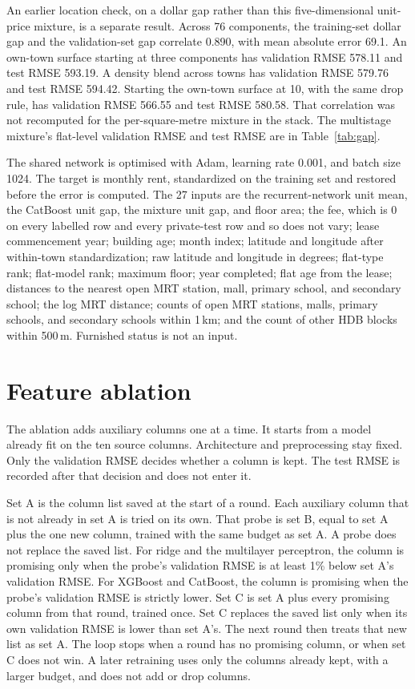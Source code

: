 \documentclass[11pt,a4paper]{article}
\begin{document}
An earlier location check, on a dollar gap rather than this five-dimensional unit-price mixture, is a separate result.
Across 76 components, the training-set dollar gap and the validation-set gap correlate 0.890, with mean absolute error 69.1.
An own-town surface starting at three components has validation RMSE 578.11 and test RMSE 593.19.
A density blend across towns has validation RMSE 579.76 and test RMSE 594.42.
Starting the own-town surface at 10, with the same drop rule, has validation RMSE 566.55 and test RMSE 580.58.
That correlation was not recomputed for the per-square-metre mixture in the stack.
The multistage mixture's flat-level validation RMSE and test RMSE are in Table~\ref{tab:gap}.

The shared network is optimised with Adam, learning rate 0.001, and batch size 1024.
The target is monthly rent, standardized on the training set and restored before the error is computed.
The 27 inputs are the recurrent-network unit mean, the CatBoost unit gap, the mixture unit gap, and floor area; the fee, which is 0 on every labelled row and every private-test row and so does not vary; lease commencement year; building age; month index; latitude and longitude after within-town standardization; raw latitude and longitude in degrees; flat-type rank; flat-model rank; maximum floor; year completed; flat age from the lease; distances to the nearest open MRT station, mall, primary school, and secondary school; the log MRT distance; counts of open MRT stations, malls, primary schools, and secondary schools within 1\,km; and the count of other HDB blocks within 500\,m.
Furnished status is not an input.

\section{Feature ablation}
\label{app:ablation}

The ablation adds auxiliary columns one at a time.
It starts from a model already fit on the ten source columns.
Architecture and preprocessing stay fixed.
Only the validation RMSE decides whether a column is kept.
The test RMSE is recorded after that decision and does not enter it.

Set A is the column list saved at the start of a round.
Each auxiliary column that is not already in set A is tried on its own.
That probe is set B, equal to set A plus the one new column, trained with the same budget as set A.
A probe does not replace the saved list.
For ridge and the multilayer perceptron, the column is promising only when the probe's validation RMSE is at least 1\% below set A's validation RMSE.
For XGBoost and CatBoost, the column is promising when the probe's validation RMSE is strictly lower.
Set C is set A plus every promising column from that round, trained once.
Set C replaces the saved list only when its own validation RMSE is lower than set A's.
The next round then treats that new list as set A.
The loop stops when a round has no promising column, or when set C does not win.
A later retraining uses only the columns already kept, with a larger budget, and does not add or drop columns.
\end{document}
